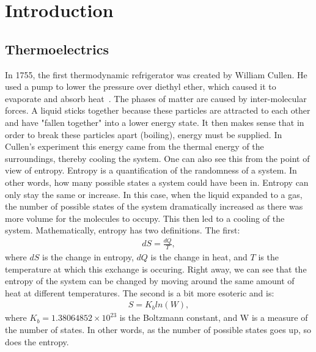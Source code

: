 \chapter{Introduction}		%
\label{introchap}

\label{section}

\section{Thermoelectrics}
	In 1755, the first thermodynamic refrigerator was created by William Cullen. He used a pump to lower the pressure over diethyl ether, which caused it to evaporate and absorb heat~\cite{Chandra??}. The phases of matter are caused by inter-molecular forces. A liquid sticks together because these particles are attracted to each other and have "fallen together" into a lower energy state. It then makes sense that in order to break these particles apart (boiling), energy must be supplied. In Cullen's experiment this energy came from the thermal energy of the surroundings, thereby cooling the system. One can also see this from the point of view of entropy. Entropy is a quantification of the randomness of a system. In other words, how many possible states a system could have been in. Entropy can only stay the same or increase. In this case, when the liquid expanded to a gas, the number of possible states of the system dramatically increased as there was more volume for the molecules to occupy. This then led to a cooling of the system. 
	Mathematically, entropy has two definitions. The first:
\begin{eqnarray}
dS = \frac{dQ}{T},
\label{dS}
\end{eqnarray}
where $dS$ is the change in entropy, $dQ$ is the change in heat, and $T$ is the temperature at which this exchange is occuring. Right away, we can see that the entropy of the system can be changed by moving around the same amount of heat at different temperatures. The second is a bit more esoteric and is:
\begin{eqnarray}
S = K_b ln (W),
\label{S}
\end{eqnarray}
where $K_b = 1.38064852 \times 10^{23}$ is the Boltzmann constant, and W is a measure of the number of states. In other words, as the number of possible states goes up, so does the entropy.

